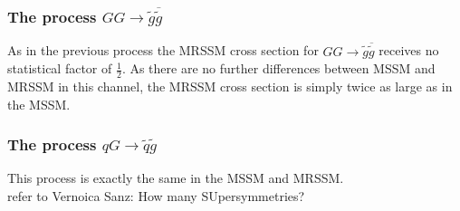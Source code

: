 \subsubsection*{The process $GG \to \tilde{g}\overline{\tilde{g}}$}
As in the previous process the MRSSM cross section for $GG \to \tilde{g}\overline{\tilde{g}}$ receives no statistical factor of $\frac{1}{2}$. As there are no further differences between MSSM and MRSSM in this channel, the MRSSM cross section is simply twice as large as in the MSSM.

\subsubsection*{The process $q G \to \tilde{q} \tilde{g}$}
This process is exactly the same in the MSSM and MRSSM.
\\
refer to Vernoica Sanz: How many SUpersymmetries?

